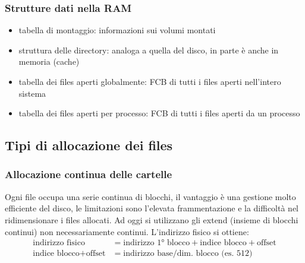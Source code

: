 \documentclass[a4paper]{article}
\begin{document}
\subsubsection*{Strutture dati nella RAM}
\begin{itemize}
	\item tabella di montaggio: informazioni sui volumi montati
	\item struttura delle directory: analoga a quella del disco, in parte è anche in memoria (cache)
	\item tabella dei files aperti globalmente: FCB di tutti i files aperti nell'intero sistema
	\item tabella dei files aperti per processo: FCB di tutti i files aperti da un processo
\end{itemize}


\subsection{Tipi di allocazione dei files}
\subsubsection*{Allocazione continua delle cartelle}
Ogni file occupa una serie continua di blocchi, il vantaggio è una gestione molto efficiente del disco, le limitazioni sono
l'elevata frammentazione e la difficoltà nel ridimensionare i files allocati. Ad oggi si utilizzano gli extend (insieme di
blocchi continui) non necessariamente continui. L'indirizzo fisico si ottiene:
\begin{align*}
	\text{indirizzo fisico} &= \text{indirizzo 1° blocco} + \text{indice blocco} + \text{offset} \\
	\text{indice blocco} + \text{offset} &= \text{indirizzo base} / \text{dim. blocco (es. 512)}
\end{align*}
\end{document}

